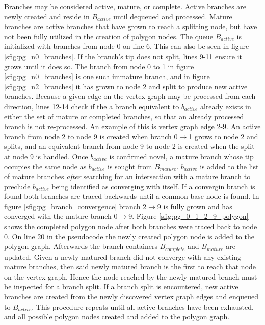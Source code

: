 Branches may be considered active, mature, or complete.
Active branches are newly created and reside in $B_{active}$ until dequeued and processed.
Mature branches are active branches that have grown to reach a splitting node, but have not been fully utilized in the creation of polygon nodes.
The queue $B_{active}$ is initialized with branches from node 0 on line 6.
This can also be seen in figure \ref{sfig:pg_n0_branches}.
If the branch's tip does not split, lines 9-11 ensure it grows until it does so.
The branch from node 0 to 1 in figure \ref{sfig:pg_n0_branches} is one such immature branch, and in figure \ref{sfig:pg_n2_branches} it has grown to node 2 and split to produce new active branches.
Because a given edge on the vertex graph may be processed from each direction, lines 12-14 check if the a branch equivalent to $b_{active}$ already exists in either the set of mature or completed branches, so that an already processed branch is not re-processed.
An example of this is vertex graph edge 2-9.
An active branch from node 2 to node 9 is created when branch 0$\rightarrow$1 grows to node 2 and splits, and an equivalent branch from node 9 to node 2 is created when the split at node 9 is handled.
Once $b_{active}$ is confirmed novel, a mature branch whose tip occupies the same node as $b_{active}$ is sought from $B_{mature}$.
$b_{active}$ is added to the list of mature branches \textit{after} searching for an intersection with a mature branch to preclude $b_{active}$ being identified as converging with itself.
If a convergin branch is found both branches are traced backwards until a common base node is found.
In figure \ref{sfig:pg_branch_convergence} branch 2$\rightarrow$9 is fully grown and has converged with the mature branch 0$\rightarrow$9.
Figure \ref{sfig:pg_0_1_2_9_polygon} shows the completed polygon node after both branches were traced back to node 0.
On line 20 in the pseudocode the newly created polygon node is added to the polygon graph.
Afterwards the branch containers $B_{complete}$ and $B_{mature}$ are updated.
Given a newly matured branch did not converge with any existing mature branches, then said newly matured branch is the first to reach that node on the vertex graph.
Hence the node reached by the newly matured branch must be inspected for a branch split.
If a branch split is encountered, new active branches are created from the newly discovered vertex graph edges and enqueued to $B_{active}$.
This procedure repeats until all active branches have been exhausted, and all possible polygon nodes created and added to the polygon graph.

